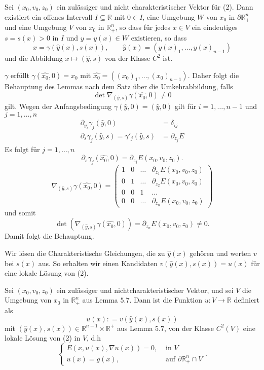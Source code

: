 \begin{lemma}
	Sei $(x_0,v_0,z_0)$ ein zulässiger und nicht charakteristischer Vektor für (2). Dann existiert ein offenes Intervall $I \subseteq \mathbb{R}$ mit $0 \in I$, eine Umgebung $W$ von $x_0$ in $\partial \mathbb{R}^n_+$ und eine Umgebung $V$ von $x_0$ in $\mathbb{R}^n_+$, so dass für jedes $x \in V$ ein eindeutiges $s = s(x) >0$ in $I$ und $y = y(x) \in W$ existieren, so dass
	\[
		x = \gamma(\hat{y}(x),s(x)), \qquad \hat{y}(x) = (y(x)_1, \dots, y(x)_{n-1})
	\]
und die Abbildung $x \mapsto (\hat{y},s)$ von der Klasse $C^2$ ist.
\end{lemma}
\begin{beweis}
	$\gamma$ erfüllt $\gamma(\hat{x_0},0)= x_0$ mit $\hat{x_0}= ((x_0)_1, \dots , (x_0)_{n-1})$. Daher folgt die Behauptung des Lemmas nach dem Satz über die Umkehrabbildung, falls
	\[
		\det  \nabla _{(\hat{y},s)} \gamma(\hat{x_0},0) \neq 0
	\]
	gilt. Wegen der Anfangsbedingung $\gamma(\hat{y},0)= (\hat{y},0)$ gilt für $i=1,\dots,n-1$ und $j=1,\dots,n$
	\begin{align*}
		\partial_{y_i} \gamma_j ( \hat{y}, 0 ) &= \delta _{ij} \\
		\partial_s \gamma_j(\hat{y},s) = \gamma'_j(\hat{y},s) &= \partial_{z_j}E
	\end{align*}
	Es folgt für $j=1,\dots,n$
	\[
		\partial_s \gamma_j (\hat{x_0},0) = \partial_{z_j} E(x_0,v_0,z_0).
	\]
	\[
		 \nabla _{(\hat{y},s)} \gamma ( \hat{x_0},0) = \begin{pmatrix}
		 	1 & 0 & \dots & \partial_{z_1}E(x_0,v_0,z_0) \\
			0 & 1 & \dots & \partial_{z_2}E(x_0,v_0,z_0) \\
			0 & 0 & 1 & \dots \\
			0 & 0 & \dots & \partial_{z_n}E(x_0,v_0,z_0)
		 \end{pmatrix}
	\]
	und somit 
	\[
		\det (  \nabla_{(\hat{y},s)} \gamma(\hat{x_0},0)) = \partial_{z_n} E(x_0,v_0,z_0) \neq 0.
	\]
	Damit folgt die Behauptung. 
\end{beweis}

Wir lösen die Charakteristische Gleichungen, die zu $\hat{y}(x)$ gehören und werten $v$ bei $s(x)$ aus. So erhalten wir einen Kandidaten $v(\hat{y}(x),s(x)) = u(x)$ 
für eine lokale Lösung von (2).

\begin{satz}
	Sei $(x_0,v_0,z_0)$ ein zulässiger und nichtcharakteristischer Vektor, und sei $V$ die Umgebung von $x_0$ in $\mathbb{R}^n_+$ aus Lemma $5.7$. Dann ist die Funktion $u: V \to \mathbb{R}$ definiert als 
	\[
		u(x) : = v( \hat{y}(x), s(x))
	\]
	mit $(\hat{y}(x),s(x)) \in \mathbb{R}^{n-1} \times \mathbb{R}^+$ aus Lemma $5.7$, von der Klasse $C^2(V)$ eine lokale Lösung von (2) in $V$, d.h
	\[
		\begin{cases}
			E(x,u(x), \nabla u(x)) = 0 , &\text{ in }V\\
			u(x) = g(x), & \text{ auf } \partial \mathbb{R}^n_+ \cap V
			
		\end{cases}.
	\]
\end{satz}

\cleardoubleoddemptypage
{}
\setcounter{page}{1}

